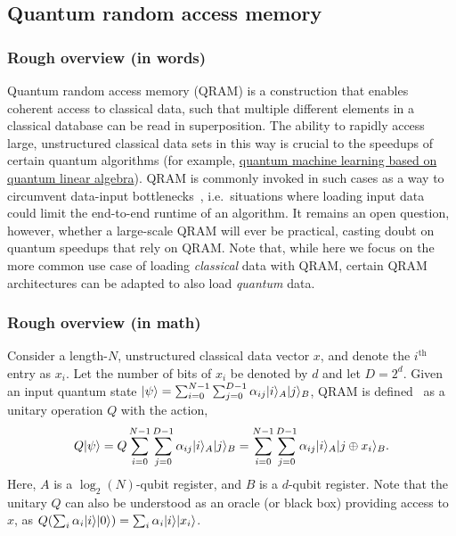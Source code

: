 \begin{refsection}

\subsection{Quantum random access memory}\label{prim:QRAM}


\subsubsection*{Rough overview (in words)}

Quantum random access memory (QRAM) is a construction that enables coherent access to classical data, such that multiple different elements in a classical database can be read in superposition. The ability to rapidly access large, unstructured classical data sets in this way is crucial to the speedups of certain quantum algorithms (for example, \hyperref[appl:QMLfromLinAlg]{quantum machine learning based on quantum linear algebra}). QRAM is commonly invoked in such cases as a way to circumvent data-input bottlenecks~\cite{aaronson2015ReadTheFinePrint}, i.e.~situations where loading input data could limit the end-to-end runtime of an algorithm. It remains an open question, however, whether a large-scale QRAM will ever be practical, casting doubt on quantum speedups that rely on QRAM. Note that, while here we focus on the more common use case of loading \emph{classical} data with QRAM, certain QRAM architectures can be adapted to also load \emph{quantum} data.   


\subsubsection*{Rough overview (in math)}

Consider a length-$N$, unstructured classical data vector $x$, and denote the $i^\mathrm{th}$ entry as $x_i$. Let the number of bits of $x_i$ be denoted by $d$ and let $D = 2^d$. Given an input quantum state $\lvert\psi\rangle = \sum_{i =0}^{N-1}\sum_{j=0}^{D-1}\alpha_{ij} \lvert i\rangle_A \lvert j\rangle_B$, QRAM is defined~\cite{giovannetti2007QuantumRAM} as a unitary operation $Q$ with the action,
\begin{equation}
    Q\lvert\psi\rangle = Q\sum_{i =0}^{N-1}\sum_{j=0}^{D-1}\alpha_{ij} \lvert i\rangle_A \lvert j\rangle_B  = \sum_{i =0}^{N-1}\sum_{j=0}^{D-1}\alpha_{ij} \lvert i\rangle_A \lvert j \oplus x_i\rangle_B.
    \label{eq:QRAM_definition}
\end{equation}
Here, $A$ is a $\log_2(N)$-qubit register, and $B$ is a $d$-qubit register. Note that the unitary $Q$ can also be understood as an oracle (or black box) providing access to $x$, as $Q(\sum_i \alpha_i \lvert i\rangle\lvert0\rangle) = \sum_i \alpha_i \lvert i\rangle\lvert x_i\rangle$.


\end{refsection}

